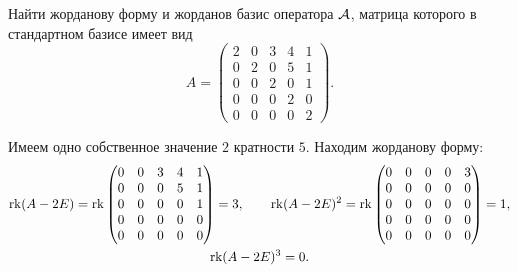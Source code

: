\begin{problem}
	Найти жорданову форму и жорданов базис оператора $\mathcal{A}$, матрица которого в стандартном базисе имеет вид
	\[
		A =
		\begin{pmatrix}
			2 & 0 & 3 & 4 & 1\\
			0 & 2 & 0 & 5 & 1\\
			0 & 0 & 2 & 0 & 1\\
			0 & 0 & 0 & 2 & 0\\
			0 & 0 & 0 & 0 & 2
		\end{pmatrix}.
	\]
\end{problem}

\begin{solution}
	Имеем одно собственное значение $2$ кратности $5$. Находим жорданову форму:
	\begin{gather*}
		\operatorname{rk}(A - 2E) = \operatorname{rk}
		\begin{pmatrix}
			0 & 0 & 3 & 4 & 1\\
			0 & 0 & 0 & 5 & 1\\
			0 & 0 & 0 & 0 & 1\\
			0 & 0 & 0 & 0 & 0\\
			0 & 0 & 0 & 0 & 0
		\end{pmatrix} = 3,\qquad
		\operatorname{rk}(A - 2E)^2 = \operatorname{rk}
		\begin{pmatrix}
			0 & 0 & 0 & 0 & 3\\
			0 & 0 & 0 & 0 & 0\\
			0 & 0 & 0 & 0 & 0\\
			0 & 0 & 0 & 0 & 0\\
			0 & 0 & 0 & 0 & 0
		\end{pmatrix} = 1,\\
		\operatorname{rk}(A - 2E)^3 = 0.
	\end{gather*}


\end{solution}
